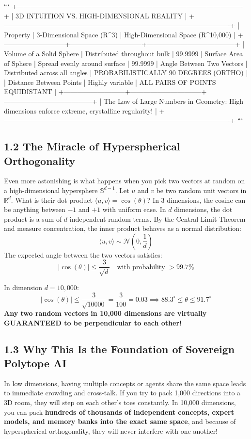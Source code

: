\documentclass[11pt,twoside,openright]{amsbook}
\begin{document}
```
+----------------------------------------------------------------------------------------------------+
| 3D INTUITION VS. HIGH-DIMENSIONAL REALITY                                                          |
+----------------------------------------------------------------------------------------------------+
| Property                  | 3-Dimensional Space (R^3)      | High-Dimensional Space (R^{10,000})   |
+---------------------------+--------------------------------+---------------------------------------+
| Volume of a Solid Sphere  | Distributed throughout bulk    | 99.9999%
| Surface Area of Sphere    | Spread evenly around surface   | 99.9999%
| Angle Between Two Vectors | Distributed across all angles  | PROBABILISTICALLY 90 DEGREES (ORTHO)  |
| Distance Between Points   | Highly variable                | ALL PAIRS OF POINTS EQUIDISTANT       |
+---------------------------+--------------------------------+---------------------------------------+
| The Law of Large Numbers in Geometry: High dimensions enforce extreme, crystalline regularity!     |
+----------------------------------------------------------------------------------------------------+
```

\subsection{1.2 The Miracle of Hyperspherical Orthogonality}
Even more astonishing is what happens when you pick two vectors at random on a high-dimensional hypersphere $\mathbb{S}^{d-1}$.
Let $u$ and $v$ be two random unit vectors in $\mathbb{R}^d$. What is their dot product $\langle u, v \rangle = \cos(\theta)$?
In 3 dimensions, the cosine can be anything between $-1$ and $+1$ with uniform ease.
In $d$ dimensions, the dot product is a sum of $d$ independent random terms. By the Central Limit Theorem and measure concentration, the inner product behaves as a normal distribution:
$$\langle u, v \rangle \sim \mathcal{N}\left(0, \frac{1}{d}\right)$$
The expected angle between the two vectors satisfies:
$$|\cos(\theta)| \le \frac{3}{\sqrt{d}} \quad \text{with probability } > 99.7\%$$

In dimension $d = 10,000$:
$$|\cos(\theta)| \le \frac{3}{\sqrt{10000}} = \frac{3}{100} = 0.03 \implies 88.3^\circ \le \theta \le 91.7^\circ$$
\textbf{Any two random vectors in 10,000 dimensions are virtually GUARANTEED to be perpendicular to each other!}

\subsection{1.3 Why This Is the Foundation of Sovereign Polytope AI}
In low dimensions, having multiple concepts or agents share the same space leads to immediate crowding and cross-talk. If you try to pack 1,000 directions into a 3D room, they will step on each other's toes constantly.
In 10,000 dimensions, you can pack \textbf{hundreds of thousands of independent concepts, expert models, and memory banks into the exact same space}, and because of hyperspherical orthogonality, they will never interfere with one another!
\end{document}
